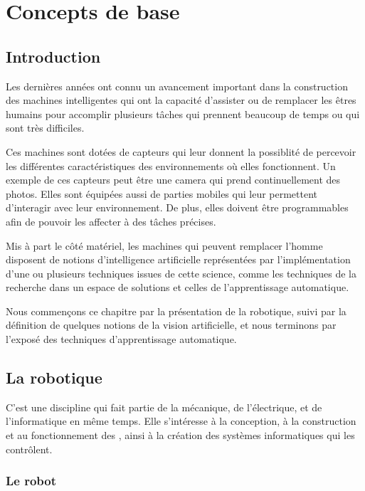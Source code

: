 \let\oldcaption\caption
\renewcommand{\caption}[2]{\oldcaption[#1]{#1#2}}

\chapter{Concepts de base}

\section{Introduction}

Les dernières années ont connu un avancement important dans la construction des
machines intelligentes qui ont la capacité d'assister ou de remplacer les
êtres humains pour accomplir plusieurs tâches qui prennent beaucoup de temps ou
qui sont très difficiles.

Ces machines sont dotées de capteurs qui leur donnent la possiblité de percevoir
les différentes caractéristiques des environnements où elles fonctionnent. Un
exemple de ces capteurs peut être une camera qui prend continuellement des photos.
Elles sont équipées aussi de parties mobiles qui leur permettent
d'interagir avec leur environnement. De plus, elles doivent
être programmables afin de pouvoir les affecter à des tâches précises.

Mis à part le côté matériel, les machines qui peuvent remplacer l'homme disposent
de notions d'intelligence artificielle représentées par l'implémentation d'une ou
plusieurs techniques issues de cette science, comme les techniques de la
recherche dans un espace de solutions et celles de l'apprentissage automatique.

Nous commençons ce chapitre par la présentation de la robotique, suivi par
la définition de quelques notions de la vision artificielle, et nous terminons
par l'exposé des techniques d'apprentissage automatique.

\section{La robotique}

C'est une discipline qui fait partie de la mécanique, de l'électrique, et de
l'informatique en même temps. Elle s'intéresse à la conception, à la
construction et au fonctionnement des , ainsi à la création
des systèmes informatiques qui les contrôlent.

\subsection{Le robot}

